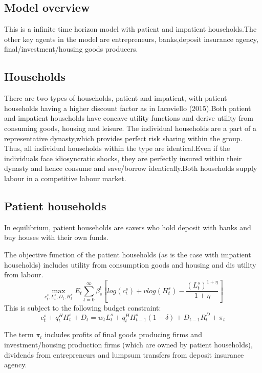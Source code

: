 \documentclass[12pt]{article}
\numberwithin{equation}{section}
\begin{document}
\begin{appendix}
\section*{Model overview}

This is a infinite time horizon model with patient and impatient households.The other key agents in the model are entrepreneurs, banks,deposit insurance agency, final/investment/housing goods producers.

\subsection*{Households}

There are two types of households, patient and impatient, with patient households having a higher discount factor as in Iacoviello (2015).Both patient and impatient households have concave utility functions and derive utility from consuming goods, housing and leisure. The individual households are a part of a representative dynasty,which provides perfect risk sharing within the group. Thus, all individual households within the type are identical.Even if the individuals face idiosyncratic shocks, they are perfectly insured within their dynasty and hence consume and save/borrow identically.Both households supply labour in a competitive labour market.

\subsection*{Patient households}
In equilibrium, patient households are savers who hold deposit with banks and buy houses with their own funds. 

The objective function of the patient households (as is the case with impatient households) includes utility from consumption goods and housing and dis utility from labour.
\begin{equation}
\max_{c^s_t,L^s_t,D_{t},H^s_t}E_t\sum _{t=0}^{\infty } \beta_{s}^t [log(c^s_t)+vlog(H^s_t)-\frac{(L^s_t)^{1+\eta}}{1+\eta} ]
\end{equation}
This is subject to the following budget constraint:
\begin{equation}
c^s_t+q^H_{t}H^s_{t} +{D_{t}}=w_{t}L^s_{t}+q^H_{t}H^s_{t-1}(1-\delta)+{D_{t-1}}R^D_{t}+\pi_{t}
\end{equation}

The term $\pi_{t}$ includes profits of final goods producing firms and investment/housing production firms (which are owned by patient households), dividends from entrepreneurs and lumpsum transfers from deposit insurance agency. 


\end{appendix}
\end{document}

